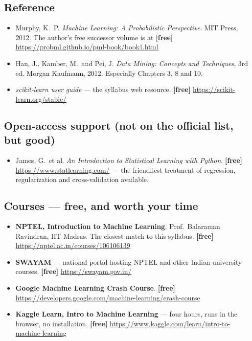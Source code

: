 \documentclass[11pt]{article}
\begin{document}
\subsection*{Reference}

\begin{itemize}[leftmargin=*]
  \item Murphy, K.\ P. \emph{Machine Learning: A Probabilistic Perspective}.
    MIT Press, 2012. The author's free successor volume is at
    \textbf{[free]} \url{https://probml.github.io/pml-book/book1.html}
  \item Han, J., Kamber, M.\ and Pei, J. \emph{Data Mining: Concepts and
    Techniques}, 3rd ed. Morgan Kaufmann, 2012. Especially Chapters 3, 8 and 10.
  \item \emph{scikit-learn user guide} --- the syllabus web resource.
    \textbf{[free]} \url{https://scikit-learn.org/stable/}
\end{itemize}

\subsection*{Open-access support (not on the official list, but good)}

\begin{itemize}[leftmargin=*]
  \item James, G.\ et al. \emph{An Introduction to Statistical Learning with
    Python}. \textbf{[free]} \url{https://www.statlearning.com/} --- the friendliest
    treatment of regression, regularization and cross-validation available.
\end{itemize}

\subsection*{Courses --- free, and worth your time}

\begin{itemize}[leftmargin=*]
  \item \textbf{NPTEL, Introduction to Machine Learning}, Prof.\ Balaraman
    Ravindran, IIT Madras. The closest match to this syllabus.
    \textbf{[free]} \url{https://nptel.ac.in/courses/106106139}
  \item \textbf{SWAYAM} --- national portal hosting NPTEL and other Indian
    university courses. \textbf{[free]} \url{https://swayam.gov.in/}
  \item \textbf{Google Machine Learning Crash Course}. \textbf{[free]}
    \url{https://developers.google.com/machine-learning/crash-course}
  \item \textbf{Kaggle Learn, Intro to Machine Learning} --- four hours, runs in
    the browser, no installation. \textbf{[free]}
    \url{https://www.kaggle.com/learn/intro-to-machine-learning}
\end{itemize}
\end{document}
